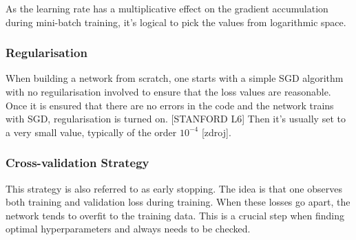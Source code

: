 As the learning rate has a multiplicative effect on the gradient accumulation during mini-batch training, it's logical to pick the values from logarithmic space. 

\subsubsection{Regularisation}

When building a network from scratch, one starts with a simple SGD algorithm with no reguilarisation involved to ensure that the loss values are reasonable. Once it is ensured that there are no errors in the code and the network trains with SGD, regularisation is turned on. [STANFORD L6] Then it's usually set to a very small value, typically of the order $ 10^{-4} $ [zdroj].
\\
\subsubsection{Cross-validation Strategy}

This strategy is also referred to as early stopping. The idea is that one observes both training and validation loss during training. When these losses go apart, the network tends to overfit to the training data. This is a crucial step when finding optimal hyperparameters and always needs to be checked.


